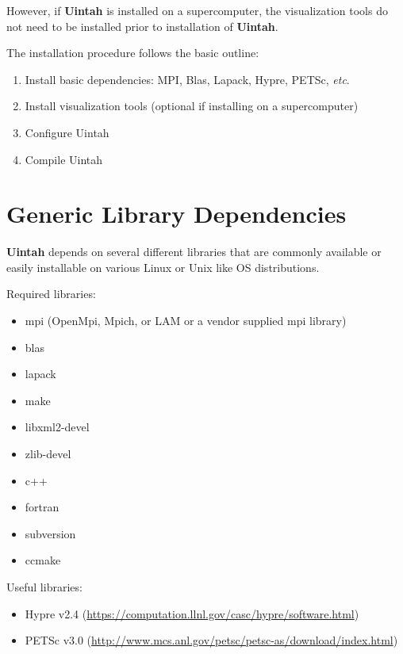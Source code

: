 \documentclass[12pt]{article}
\begin{document}
However, if \textbf{Uintah} is installed on a supercomputer, the
visualization tools do not need to be installed prior to installation
of \textbf{Uintah}.

The installation procedure follows the basic outline:

\begin{enumerate}

\item Install basic dependencies: MPI, Blas, Lapack, Hypre, PETSc, \emph{etc}.

\item Install visualization tools (optional if installing on a supercomputer)

\item Configure Uintah

\item Compile Uintah


\end{enumerate}


\section{Generic Library Dependencies}

\textbf{Uintah} depends on several different libraries that are commonly
available or easily installable on various Linux or Unix like OS
distributions.  

Required libraries:
\begin{itemize}
\item mpi (OpenMpi, Mpich, or LAM or a vendor supplied mpi library)
\item blas
\item lapack
\item make
\item libxml2-devel
\item zlib-devel
\item c++
\item fortran
\item subversion
\item ccmake

\end{itemize}

Useful libraries:
\begin{itemize}
\item Hypre v2.4 (\url{https://computation.llnl.gov/casc/hypre/software.html})
\item PETSc v3.0 (\url{http://www.mcs.anl.gov/petsc/petsc-as/download/index.html})
\end{itemize}
\end{document}
